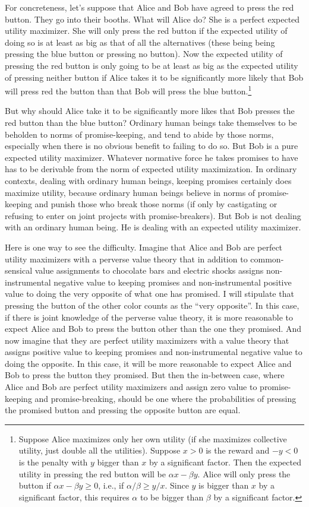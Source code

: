 For concreteness, let's suppose that Alice and Bob have agreed to press the red button. They go into their booths. 
What will Alice do? She is a perfect expected  utility maximizer. She will only press the red button if the expected
utility of doing so is at least as big as that of all the alternatives (these being being pressing the blue button or 
pressing no button). Now the expected utility of pressing the red button is only going to be at least as big as the
expected utility of pressing neither button if Alice takes it to be significantly more likely that Bob will press red
the button than that Bob will press the blue button.\footnote{Suppose Alice maximizes only her own utility (if she
maximizes collective utility, just double all the utilities). Suppose $x>0$ is the reward and $-y<0$ is the penalty with
$y$  bigger than $x$ by a significant factor. Then the expected utility in pressing the red button will be $\alpha x-\beta y$.
Alice will only press the button if $\alpha x-\beta y\ge 0$, i.e., if $\alpha/\beta \ge y/x$. Since $y$ is bigger
than $x$ by a significant factor, this requires $\alpha$ to be bigger than $\beta$ by a significant factor.} 

But why should Alice take it to be significantly more likes that Bob presses the red button than the blue button? 
Ordinary human beings take themselves to be beholden to norms of promise-keeping, and tend to abide by those norms,
especially when there is no obvious benefit to failing to do so. But Bob is a pure expected utility maximizer. Whatever
normative force he takes promises to have has to be derivable from the norm of expected utility maximization. In ordinary
contexts, dealing with ordinary human beings, keeping promises certainly does maximize utility, because ordinary human beings
believe in norms of promise-keeping and punish those who break those norms (if only by castigating or refusing to enter on
joint projects with promise-breakers). But Bob is not dealing with an ordinary human being. He is dealing with an expected 
utility maximizer. 

Here is one way to see the difficulty. Imagine that Alice and Bob are perfect utility maximizers with a perverse value theory
that in addition to common-sensical value assignments to chocolate bars and electric shocks assigns non-instrumental negative value to keeping 
promises and non-instrumental positive value to doing the very opposite of what one has promised. I will stipulate that pressing the button of 
the other color counts as the ``very opposite''. In this case, if there is joint knowledge of the perverse value theory, it 
is more reasonable to expect Alice and Bob to press the button other than the one they promised. And now imagine that they are 
perfect utility maximizers with a value theory that assigns positive value to keeping promises and non-instrumental negative value
to doing the opposite. In this case, it will be more reasonable to expect Alice and Bob to press the button they promised. But 
then the in-between case, where Alice and Bob are perfect utility maximizers and assign zero value to promise-keeping and
promise-breaking, should be one where the probabilities of pressing the promised button and pressing the opposite button are
equal. 

